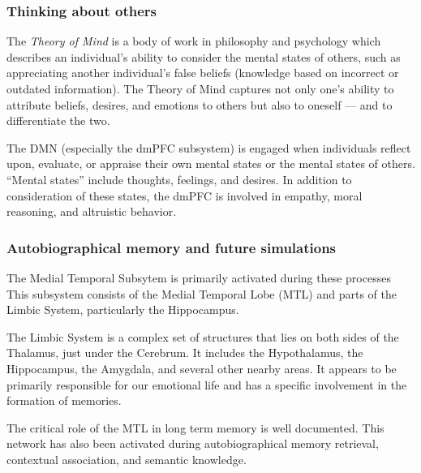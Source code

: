 \documentclass[a4paper, amsfonts, amssymb, amsmath, reprint, showkeys, nofootinbib, twoside]{revtex4-1}
\begin{document}
\subsubsection{Thinking about others}

The \textit{Theory of Mind} is a body of work in philosophy and psychology which
describes an individual's ability to consider the mental states of others, such as
appreciating another individual's false beliefs (knowledge based on incorrect or
outdated information). The Theory of Mind captures not only one's ability to
attribute beliefs, desires, and emotions to others but also to oneself --- and to
differentiate the two. \cite{autistictheoryofmind}

The DMN (especially the dmPFC subsystem) is engaged when individuals reflect upon,
evaluate, or appraise their own mental states or the mental states of others. ``Mental
states'' include thoughts, feelings, and desires. \cite{theoryofmind} In addition to
consideration of these states, the dmPFC is involved in empathy, moral reasoning,
and altruistic behavior. \cite{defaultnetworkadaptive,dmpfcothers,dmpfcaltruism}

\subsubsection{Autobiographical memory and future simulations}


The Medial Temporal Subsytem is primarily activated during these processes
This subsystem consists of the Medial Temporal Lobe (MTL) and parts of the Limbic
System, particularly the Hippocampus.

The Limbic System is a complex set of structures that lies on both sides of the
Thalamus, just under the Cerebrum. It includes the Hypothalamus, the Hippocampus, the
Amygdala, and several other nearby areas. It appears to be primarily responsible for
our emotional life and has a specific involvement in the formation of memories. \cite{limbic}

The critical role of the MTL in long term memory is well documented. \cite{mtl}
This network  has also been activated during autobiographical memory retrieval,
contextual association, and semantic knowledge. \cite{defaultnetworkadaptive}
\end{document}
